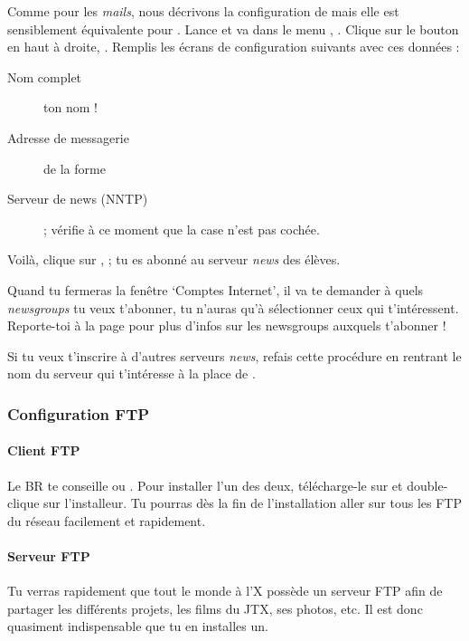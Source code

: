 Comme pour les \emph{mails}, nous décrivons la configuration de  mais elle est sensiblement équivalente pour . Lance
 et va dans le menu , . Clique sur le bouton  en haut à droite,
. Remplis les écrans de configuration suivants avec ces données :
\begin{description}
  \item[Nom complet] ton nom !
  \item[Adresse de messagerie] de la forme 
  \item[Serveur de news (NNTP)] \fkz ; vérifie à ce moment que la case
        n'est pas cochée.
\end{description}
Voilà, clique sur , ; tu es abonné
au serveur \emph{news} des élèves.

Quand tu fermeras la fenêtre `Comptes Internet', il va te demander à
quels \emph{newsgroups} tu veux t'abonner, tu n'auras qu'à sélectionner
ceux qui t'intéressent. Reporte-toi à la page \pageref{newsgroups}
pour plus d'infos sur les newsgroups auxquels t'abonner !

Si tu veux t'inscrire à d'autres serveurs \emph{news}, refais cette
procédure en rentrant le nom du serveur qui t'intéresse à la place
de \fkz.

\subsubsection{Configuration FTP}

\paragraph{Client FTP}
Le BR te conseille  ou . Pour installer l'un des deux, télécharge-le sur \xshare et double-clique sur l'installeur.
Tu pourras dès la fin de l'installation aller sur tous les FTP du réseau
facilement et rapidement.

\paragraph{Serveur FTP}
Tu verras rapidement que tout le monde à l'X possède un serveur FTP
afin de partager les différents projets, les films du JTX, ses
photos, etc. Il est donc quasiment indispensable que tu en installes
un.

